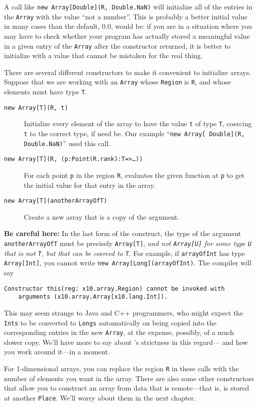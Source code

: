 A call like 
{\tt new Array[Double](R, Double.NaN)} will initialize all of the entries in
the {\tt Array} 
with the value ``not a number''.
This is probably a better
initial value in many cases than the default, 0.0, would be:
if
you
are
in
a
situation where you may have to check whether your program has actually stored a
meaningful value in a given entry of the {\tt Array} after the constructor
returned, it is better to initialize with a value that cannot be mistaken for
the real thing.

There are several different constructors to make it convenient to initialize
arrays.  Suppose that we are working with an {\tt Array} whose {\tt Region} is
{\tt R}, and whose elements must have type {\tt T}.
\begin{description}
\item[{\tt new Array[T](R, t)}] Initialize every element of the array to
have the value {\tt t} of type {\tt T}, coercing {\tt t} to the correct type, if
need be.  Our example ``{\tt new Array[ Double](R, Double.NaN)}'' used this
call.
\item[{\tt new Array[T](R, (p:Point(R.rank):T=>\ldots))}] For each point {\tt p}
in the region {\tt R}, evaluates the given function at {\tt p} to get the
initial value for that entry in the array.
\item[{\tt new Array[T](anotherArrayOfT)}] Create a new array that is a copy of
the argument.  
\end{description}
{\bf Be careful here:} In the last form of the construct, the type of the
argument {\tt another\-Ar\-rayOfT} must be precisely {\tt Array[T]}, {\em and
not {\tt Array[U]} for some type {\tt U} that is not {\tt T}, but that can be
coerced to {\tt T}}.  For example, if {\tt arrayOfInt} has type {\tt
Array[Int]}, you cannot write {\tt new Array[Long](arrayOfInt)}.  The compiler
will say
\begin{verbatim}
Constructor this(reg: x10.array.Region) cannot be invoked with
    arguments (x10.array.Array[x10.lang.Int]).
\end{verbatim}
This may seem strange to Java and C++ programmers, who might expect the {\tt
Ints} to be converted to {\tt Longs} automatically on being copied into the
corresponding entries in the new {\tt Array}, at the expense, possibly, of a
much slower copy. We'll have more to say about \Xten's strictness in this
regard--- and how you work around it---in a moment.

For 1-dimensional arrays, you can replace the region {\tt R} in these calls with
the number of elements you want in the array.
There are also some other constructors that allow you to construct an array from
data that is remote---that is, is stored at another {\tt Place}.  We'll worry about
them in the next chapter.

